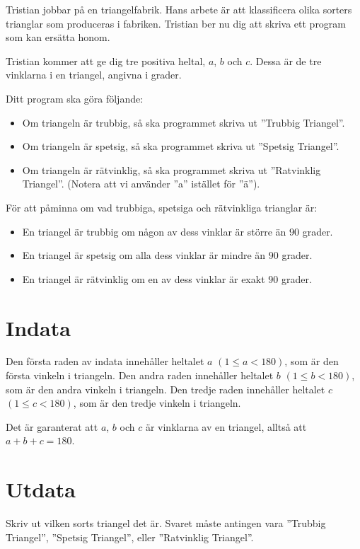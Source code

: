 \noindent

Tristian jobbar på en triangelfabrik.
Hans arbete är att klassificera olika sorters trianglar som produceras i fabriken.
Tristian ber nu dig att skriva ett program som kan ersätta honom.

Tristian kommer att ge dig tre positiva heltal, $a$, $b$ och $c$. 
Dessa är de tre vinklarna i en triangel, angivna i grader.

Ditt program ska göra följande:
\begin{itemize}
  \item Om triangeln är trubbig, så ska programmet skriva ut ''Trubbig Triangel''.
  \item Om triangeln är spetsig, så ska programmet skriva ut ''Spetsig Triangel''.
  \item Om triangeln är rätvinklig, så ska programmet skriva ut ''Ratvinklig Triangel''.
  (Notera att vi använder ''a'' istället för ''ä'').
\end{itemize}

För att påminna om vad trubbiga, spetsiga och rätvinkliga trianglar är:
\begin{itemize}
  \item En triangel är trubbig om någon av dess vinklar är större än $90$ grader.
  \item En triangel är spetsig om alla dess vinklar är mindre än $90$ grader.
  \item En triangel är rätvinklig om en av dess vinklar är exakt $90$ grader.
\end{itemize}


\section*{Indata}
Den första raden av indata innehåller heltalet $a$ $(1 \leq a < 180)$, som är den första vinkeln i triangeln.
Den andra raden innehåller heltalet $b$ $(1 \leq b < 180)$, som är den andra vinkeln i triangeln.
Den tredje raden innehåller heltalet $c$ $(1 \leq c < 180)$, som är den tredje vinkeln i triangeln.

Det är garanterat att $a$, $b$ och $c$ är vinklarna av en triangel, alltså att $a + b + c = 180$.

\section*{Utdata}
Skriv ut vilken sorts triangel det är. Svaret måste antingen vara ''Trubbig Triangel'',
''Spetsig Triangel'', eller ''Ratvinklig Triangel''.

